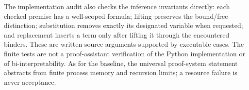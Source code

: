 The implementation audit also checks the inference invariants directly:
each checked premise has a well-scoped formula; lifting preserves the
bound/free distinction; substitution removes exactly its designated
variable when requested; and replacement inserts a term only after
lifting it through the encountered binders. These are written source
arguments supported by executable cases. The finite tests are not a
proof-assistant verification of the Python implementation or of
bi-interpretability. As for the baseline, the universal proof-system
statement abstracts from finite process memory and recursion limits;
a resource failure is never acceptance.
